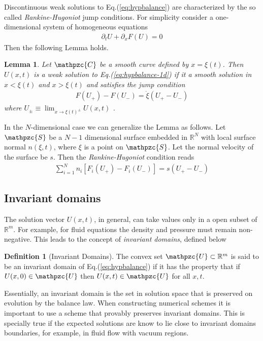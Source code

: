 \documentclass[11pt, reqno]{amsart}
\newcommand{\eqr}[1]{Eq.\thinspace(#1)}
\newcommand{\spfrac}[2]{{\partial_{#1}} {#2}}
\newcommand{\script}[1]{\mathpzc{#1}}
\newtheorem{lem}{Lemma}
\theoremstyle{definition}
\newtheorem{dfn}{Definition}
\begin{document}
Discontinuous weak solutions to \eqr{\ref{eq:hypbalance}} are
characterized by the so called \emph{Rankine-Hugoniot} jump
conditions. For simplicity consider a one-dimensional system of
homogeneous equations
\begin{align}
  \spfrac{t}{U} + \spfrac{x}{F(U)} = 0
  \label{eq:hypbalance-1d}
\end{align}
Then the following Lemma holds.
\begin{lem}
  Let $\script{C}$ be a smooth curve defined by $x=\xi(t)$. Then
  $U(x,t)$ is a \emph{weak} solution to \eqr{\ref{eq:hypbalance-1d}}
  if it a smooth solution in $x<\xi(t)$ and $x>\xi(t)$ and satisfies
  the jump condition
  \begin{align}
    F(U_+) - F(U_-) = \dot{\xi}(U_+ - U_-)
  \end{align}
  where $U_\pm \equiv \lim_{x\rightarrow \xi(t)^\pm}U(x,t)$ .
\end{lem}

In the $N$-dimensional case we can generalize the Lemma as
follows. Let $\script{S}$ be a $N-1$ dimensional surface embedded in
$\mathbb{R}^N$ with local surface normal $n(\xi,t)$, where $\xi$ is a
point on $\script{S}$. Let the normal velocity of the surface be
$s$. Then the \emph{Rankine-Hugoniot} condition reads
\begin{align}
  \sum_{i=1}^N 
  n_i[F_i(U_+) - F_i(U_-)] = s(U_+ - U_-)
\end{align}

\subsection{Invariant domains}

The solution vector $U(x,t)$, in general, can take values only in a
open subset of $\mathbb{R}^m$. For example, for fluid equations the
density and pressure must remain non-negative. This leads to the
concept of \emph{invariant domains}, defined below
\begin{dfn}[Invariant Domains]
  The convex set $\script{U} \subset \mathbb{R}^m$ is said to be an
  invariant domain of \eqr{\ref{eq:hypbalance}} if it has the property
  that if $U(x,0) \in \script{U}$ then $U(x,t) \in \script{U}$ for all
  $x,t$.
\end{dfn}

Essentially, an invariant domain is the set in solution space that is
preserved on evolution by the balance law. When constructing numerical
schemes it is important to use a scheme that provably preserves
invariant domains. This is specially true if the expected solutions
are know to lie close to invariant domains boundaries, for example, in
fluid flow with vacuum regions.
\end{document}
